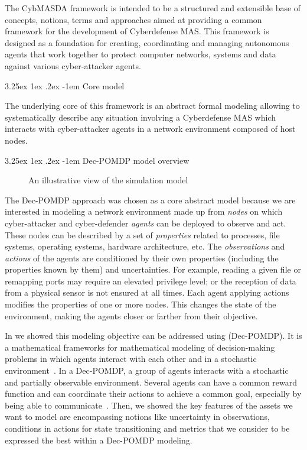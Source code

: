 \documentclass[conference]{IEEEtran}
\makeatletter
\renewcommand\paragraph{\@startsection{paragraph}{5}{\z@}%
  {3.25ex \@plus1ex \@minus.2ex}%
  {-1em}%
  {\normalfont\normalsize\bfseries}}
\renewcommand\subparagraph{\@startsection{subparagraph}{6}{\parindent}%
  {3.25ex \@plus1ex \@minus .2ex}%
  {-1em}%
  {\normalfont\normalsize\bfseries}}
\makeatother
\begin{document}
The CybMASDA framework is intended to be a structured and extensible base of concepts, notions, terms and approaches aimed at providing a common framework for the development of Cyberdefense MAS. This framework is designed as a foundation for creating, coordinating and managing autonomous agents that work together to protect computer networks, systems and data against various cyber-attacker agents.

\paragraph{Core model}

The underlying core of this framework is an abstract formal modeling allowing to systematically describe any situation involving a Cyberdefense MAS which interacts with cyber-attacker agents in a network environment composed of host nodes. 

\subparagraph{Dec-POMDP model overview}

\begin{figure*}[]
    \centering
    
    \caption{An illustrative view of the simulation model}
    \label{fig:model_example_illustration}
\end{figure*}

The Dec-POMDP approach was chosen as a core abstract model because we are interested in modeling a network environment made up from \textit{nodes} on which cyber-attacker and cyber-defender \textit{agents} can be deployed to observe and act. These nodes can be described by a set of \textit{properties} related to processes, file systems, operating systems, hardware architecture, etc.
The \textit{observations} and \textit{actions} of the agents are conditioned by their own properties (including the properties known by them) and uncertainties. For example, reading a given file or remapping ports may require an elevated privilege level; or the reception of data from a physical sensor is not ensured at all times.
Each agent applying actions modifies the properties of one or more nodes. This changes the state of the environment, making the agents closer or farther from their objective.

In \cite{soule2023} we showed this modeling objective can be addressed using  (Dec-POMDP). It is a mathematical frameworks for mathematical modeling of decision-making problems in which agents interact with each other and in a stochastic environment~\cite{beynier2010}. In a Dec-POMDP, a group of agents interacts with a stochastic and partially observable environment. Several agents can have a common reward function and can coordinate their actions to achieve a common goal, especially by being able to communicate~\cite{bernstein2013}.
Then, we showed the key features of the assets we want to model are encompassing notions like uncertainty in observations, conditions in actions for state transitioning and metrics that we consider to be expressed the best within a Dec-POMDP modeling.
\end{document}
